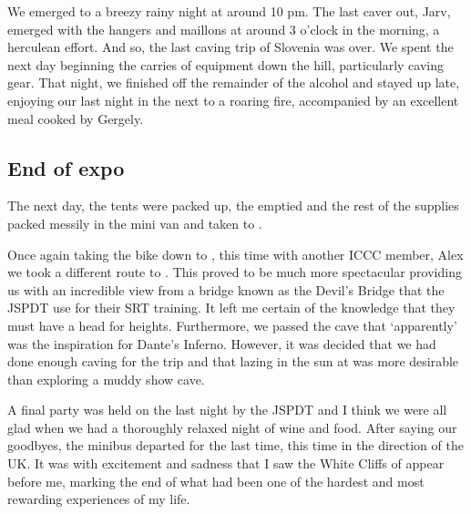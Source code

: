 
We emerged to
a breezy rainy night at around 10 pm. The last caver out, Jarv, emerged
with the hangers and maillons at around 3 o'clock in the morning, a
herculean effort. And so, the last caving trip of Slovenia was over. We
spent the next day beginning the carries of equipment down the hill,
particularly caving gear. That night, we finished off the remainder of
the alcohol and stayed up late, enjoying our last night in the  next
to a roaring fire, accompanied by an excellent meal cooked by Gergely.



\subsection{End of expo}

The next day, the tents were packed up, the  emptied and the rest of
the supplies packed messily in the mini van and taken to .

Once again taking the bike down to , this time with another ICCC
member, Alex we took a different route to . This proved to be much
more spectacular providing us with an incredible view from a bridge
known as the Devil's Bridge that the JSPDT use for their SRT training.
It left me certain of the knowledge that they must have a head for
heights. Furthermore, we passed the cave that `apparently' was the
inspiration for Dante's Inferno. However, it was decided that we had
done enough caving for the trip and that lazing in the sun at  was
more desirable than exploring a muddy show cave.

A final party was held on the last night by the JSPDT and I think we
were all glad when we had a thoroughly relaxed night of wine and food.
After saying our goodbyes, the minibus departed  for the last
time, this time in the direction of the UK. It was with excitement and
sadness that I saw the White Cliffs of  appear before me, marking
the end of what had been one of the hardest and most rewarding
experiences of my life.


